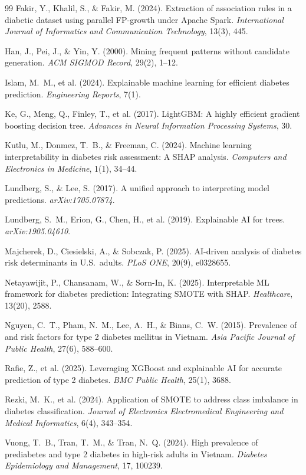 ﻿\documentclass[12pt,a4paper]{article}
\begin{document}
\begin{thebibliography}{99}
Fakir, Y., Khalil, S., \& Fakir, M. (2024).
Extraction of association rules in a diabetic dataset using parallel FP-growth under Apache Spark.
\textit{International Journal of Informatics and Communication Technology}, 13(3), 445.

Han, J., Pei, J., \& Yin, Y. (2000).
Mining frequent patterns without candidate generation.
\textit{ACM SIGMOD Record}, 29(2), 1--12.

Islam, M.~M., et al. (2024).
Explainable machine learning for efficient diabetes prediction.
\textit{Engineering Reports}, 7(1).

Ke, G., Meng, Q., Finley, T., et al. (2017).
LightGBM: A highly efficient gradient boosting decision tree.
\textit{Advances in Neural Information Processing Systems}, 30.

Kutlu, M., Donmez, T.~B., \& Freeman, C. (2024).
Machine learning interpretability in diabetes risk assessment: A SHAP analysis.
\textit{Computers and Electronics in Medicine}, 1(1), 34--44.

Lundberg, S., \& Lee, S. (2017).
A unified approach to interpreting model predictions.
\textit{arXiv:1705.07874}.

Lundberg, S.~M., Erion, G., Chen, H., et al. (2019).
Explainable AI for trees.
\textit{arXiv:1905.04610}.

Majcherek, D., Ciesielski, A., \& Sobczak, P. (2025).
AI-driven analysis of diabetes risk determinants in U.S.\ adults.
\textit{PLoS ONE}, 20(9), e0328655.

Netayawijit, P., Chansanam, W., \& Sorn-In, K. (2025).
Interpretable ML framework for diabetes prediction: Integrating SMOTE with SHAP.
\textit{Healthcare}, 13(20), 2588.

Nguyen, C.~T., Pham, N.~M., Lee, A.~H., \& Binns, C.~W. (2015).
Prevalence of and risk factors for type 2 diabetes mellitus in Vietnam.
\textit{Asia Pacific Journal of Public Health}, 27(6), 588--600.

Rafie, Z., et al. (2025).
Leveraging XGBoost and explainable AI for accurate prediction of type 2 diabetes.
\textit{BMC Public Health}, 25(1), 3688.

Rezki, M.~K., et al. (2024).
Application of SMOTE to address class imbalance in diabetes classification.
\textit{Journal of Electronics Electromedical Engineering and Medical Informatics}, 6(4), 343--354.

Vuong, T.~B., Tran, T.~M., \& Tran, N.~Q. (2024).
High prevalence of prediabetes and type 2 diabetes in high-risk adults in Vietnam.
\textit{Diabetes Epidemiology and Management}, 17, 100239.

\end{thebibliography}
\end{document}
